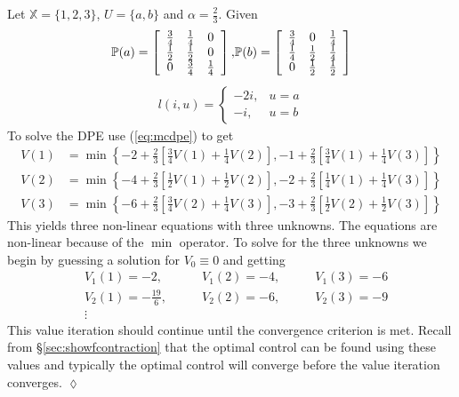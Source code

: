 \begin{example}
\label{ex:valit}
Let $\mathbb{X}=\{1,2,3\}$, $U=\{a,b\}$ and $\alpha=\frac{2}{3}$. Given
\begin{align*}
\begin{split}
\mathbb{P}(a) = \left[\begin{array}{c c c} \frac{3}{4} & \frac{1}{4} & 0 \\ \frac{1}{2} & \frac{1}{2} & 0 \\ 0 & \frac{3}{4} & \frac{1}{4} \end{array}\right],
\end{split}
\begin{split}
\mathbb{P}(b) = \left[\begin{array}{c c c} \frac{3}{4} & 0 & \frac{1}{4} \\ \frac{1}{4} & \frac{1}{2} & \frac{1}{4} \\ 0 & \frac{1}{2} & \frac{1}{2} \end{array}\right]
\end{split}
\end{align*}
\begin{align*}
l(i,u) = \begin{cases} -2i, & u=a \\ -i, & u=b \end{cases}
\end{align*}
To solve the DPE use (\ref{eq:mcdpe}) to get
\begin{align*}
V(1) &= \min\left\lbrace-2+\frac{2}{3}\left[\frac{3}{4}V(1)+\frac{1}{4}V(2)\right], -1+\frac{2}{3}\left[\frac{3}{4}V(1)+\frac{1}{4}V(3)\right]\right\rbrace \\
V(2) &= \min\left\lbrace-4+\frac{2}{3}\left[\frac{1}{2}V(1)+\frac{1}{2}V(2)\right], -2+\frac{2}{3}\left[\frac{1}{4}V(1)+\frac{1}{4}V(3)\right]\right\rbrace \\
V(3) &= \min\left\lbrace-6+\frac{2}{3}\left[\frac{3}{4}V(2)+\frac{1}{4}V(3)\right], -3+\frac{2}{3}\left[\frac{1}{2}V(2)+\frac{1}{2}V(3)\right]\right\rbrace
\end{align*}
This yields three non-linear equations with three unknowns. The equations are non-linear because of the $\min$ operator. To solve for the three unknowns we begin by guessing a solution for $V_0\equiv0$ and getting
\begin{align*}
&V_1(1) = -2, \qquad &V_1(2) = -4, \qquad &V_1(3) = -6 \\
&V_2(1) = -\frac{19}{6}, \qquad &V_2(2) = -6, \qquad &V_2(3) = -9 \\
&\vdots
\end{align*}
This value iteration should continue until the convergence criterion is met. Recall from \S\ref{sec:showfcontraction} that the optimal control can be found using these values and typically the optimal control will converge before the value iteration converges.
$\lozenge$
\end{example}

